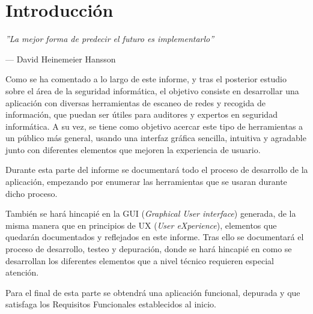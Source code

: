 \chapter{Introducción}

\epigraph{\textit{''La mejor forma de predecir el futuro es implementarlo''}}{--- David Heinemeier Hansson}

Como se ha comentado a lo largo de este informe, y tras el posterior estudio sobre el área de la seguridad informática, el objetivo consiste en desarrollar una aplicación con diversas herramientas de escaneo de redes y recogida de información, que puedan ser útiles para auditores y expertos en seguridad informática. A su vez, se tiene como objetivo acercar este tipo de herramientas a un público más general, usando una interfaz gráfica sencilla, intuitiva y agradable junto con diferentes elementos que mejoren la experiencia de usuario.

Durante esta parte del informe se documentará todo el proceso de desarrollo de la aplicación, empezando por enumerar las herramientas que se usaran durante dicho proceso.

También se hará hincapié en la GUI (\textit{Graphical User interface}) generada, de la misma manera que en principios de UX (\textit{User eXperience}), elementos que quedarán documentados y reflejados en este informe. Tras ello se documentará el proceso de desarrollo, testeo y depuración, donde se hará hincapié en como se desarrollan los diferentes elementos que a nivel técnico requieren especial atención.

Para el final de esta parte se obtendrá una aplicación funcional, depurada y que satisfaga los Requisitos Funcionales establecidos al inicio.

